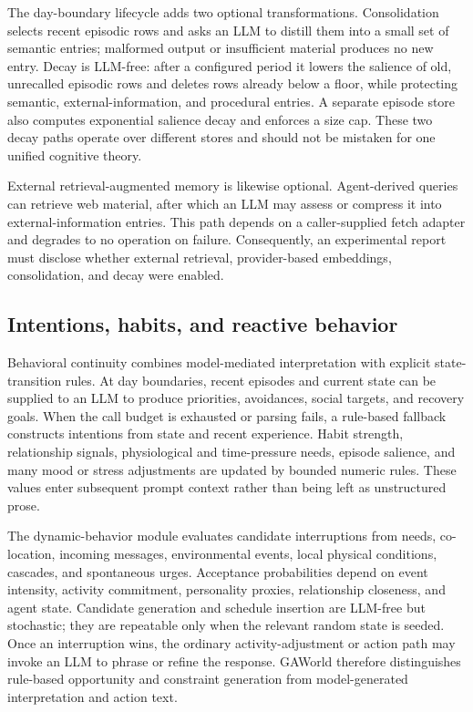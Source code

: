 The day-boundary lifecycle adds two optional transformations.  Consolidation
selects recent episodic rows and asks an LLM to distill them into a small set of
semantic entries; malformed output or insufficient material produces no new
entry.  Decay is LLM-free: after a configured period it lowers the salience of
old, unrecalled episodic rows and deletes rows already below a floor, while
protecting semantic, external-information, and procedural entries.  A separate
episode store also computes exponential salience decay and enforces a size cap.
These two decay paths operate over different stores and should not be mistaken
for one unified cognitive theory.

External retrieval-augmented memory is likewise optional.  Agent-derived
queries can retrieve web material, after which an LLM may assess or compress
it into external-information entries.  This path depends on a caller-supplied
fetch adapter and degrades to no operation on failure.  Consequently, an
experimental report must disclose whether external retrieval, provider-based
embeddings, consolidation, and decay were enabled.

\subsection{Intentions, habits, and reactive behavior}

Behavioral continuity combines model-mediated interpretation with explicit
state-transition rules.  At day boundaries, recent episodes and current state
can be supplied to an LLM to produce priorities, avoidances, social targets,
and recovery goals.  When the call budget is exhausted or parsing fails, a
rule-based fallback constructs intentions from state and recent experience.
Habit strength, relationship signals, physiological and time-pressure needs,
episode salience, and many mood or stress adjustments are updated by bounded
numeric rules.  These values enter subsequent prompt context rather than being
left as unstructured prose.

The dynamic-behavior module evaluates candidate interruptions from needs,
co-location, incoming messages, environmental events, local physical
conditions, cascades, and spontaneous urges.  Acceptance probabilities depend
on event intensity, activity commitment, personality proxies, relationship
closeness, and agent state.  Candidate generation and schedule insertion are
LLM-free but stochastic; they are repeatable only when the relevant random
state is seeded.  Once an interruption wins, the ordinary activity-adjustment
or action path may invoke an LLM to phrase or refine the response.  GAWorld
therefore distinguishes rule-based opportunity and constraint generation from
model-generated interpretation and action text.

